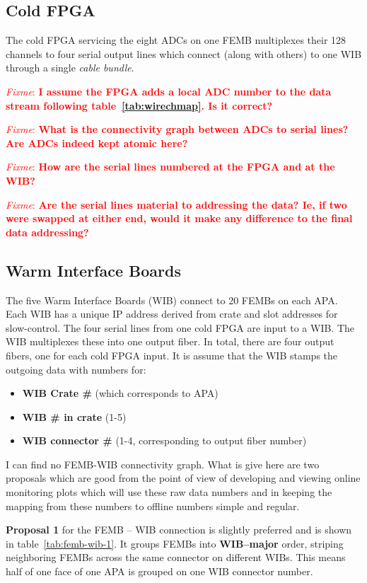 \documentclass[pdftex,12pt,letter]{article}
\newcommand{\fixme}[1]{\textcolor{red}{\textit{Fixme}: \textbf{#1}}}
\begin{document}
\subsection{Cold FPGA}

The cold FPGA servicing the eight ADCs on one FEMB multiplexes their
128 channels to four serial output lines which connect (along with
others) to one WIB through a single \textit{cable bundle}.

\fixme{I assume the FPGA adds a local ADC number to the data stream following table~\ref{tab:wirechmap}.  Is it correct?}

\fixme{What is the connectivity graph between ADCs to serial lines?  Are ADCs indeed kept atomic here?}

\fixme{How are the serial lines numbered at the FPGA and at the WIB?}

\fixme{Are the serial lines material to addressing the data?  Ie, if two were swapped at either end, would it make any difference to the final data addressing?}


\subsection{Warm Interface Boards}


The five Warm Interface Boards (WIB) connect to 20 FEMBs on each APA.
Each WIB has a unique IP address derived from crate and slot addresses
for slow-control.  The four serial lines from one cold FPGA are input
to a WIB.  The WIB multiplexes these into one output fiber.  In total,
there are four output fibers, one for each cold FPGA input.  It is
assume that the WIB stamps the outgoing data with numbers for:

\begin{itemize}
\item \textbf{WIB Crate \#} (which corresponds to APA)
\item \textbf{WIB \# in crate} (1-5)
\item \textbf{WIB connector \#} (1-4, corresponding to output fiber number)
\end{itemize}

I can find no FEMB-WIB connectivity graph.  What is give here are two
proposals which are good from the point of view of developing and
viewing online monitoring plots which will use these raw data numbers
and in keeping the mapping from these numbers to offline numbers
simple and regular.  

\textbf{Proposal 1} for the FEMB -- WIB connection is slightly
preferred and is shown in table~\ref{tab:femb-wib-1}.  It groups FEMBs
into \textbf{WIB--major} order, striping neighboring FEMBs across the
same connector on different WIBs.  This means half of one face of one
APA is grouped on one WIB connector number.
\end{document}
